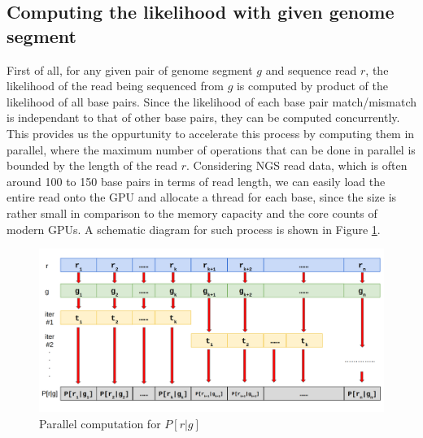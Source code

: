 \documentclass{PHlab-thesis}
\begin{document}
\subsection{Computing the likelihood with given genome segment}
First of all, for any given pair of genome segment $g$ and sequence read $r$, the likelihood of the read being sequenced from $g$ is computed by product of the likelihood of all base pairs. Since the likelihood of each base pair match/mismatch is independant to that of other base pairs, they can be computed concurrently. This provides us the oppurtunity to accelerate this process by computing them in parallel, where the maximum number of operations that can be done in parallel is bounded by the length of the read $r$. Considering NGS read data, which is often around 100 to 150 base pairs in terms of read length, we can easily load the entire read onto the GPU and allocate a thread for each base, since the size is rather small in comparison to the memory capacity and the core counts of modern GPUs. A schematic diagram for such process is shown in Figure \ref{fig:prg}.
\begin{figure}
	\centering
	\includegraphics[scale=0.3]{figures/method1.png}
	\caption{Parallel computation for $P[r|g]$}
	\label{fig:prg} %
\end{figure}
\end{document}
